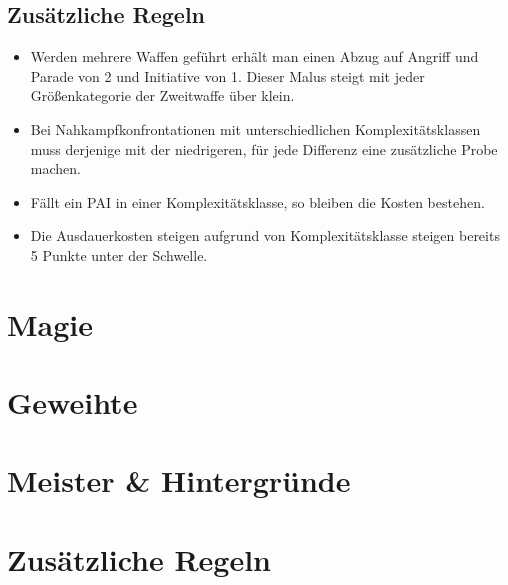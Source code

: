 \documentclass[a4paper,12pt,oneside]{book}
\begin{document}
\chapter{Zusätzliche Regeln}
\begin{itemize}
\item Werden mehrere Waffen geführt erhält man einen Abzug auf Angriff und Parade von 2 und Initiative von 1. Dieser Malus steigt mit jeder Größenkategorie der Zweitwaffe über klein.
\item Bei Nahkampfkonfrontationen mit unterschiedlichen Komplexitätsklassen muss derjenige mit der niedrigeren, für jede Differenz eine zusätzliche Probe machen.
\item Fällt ein PAI in einer Komplexitätsklasse, so bleiben die Kosten bestehen.
\item Die Ausdauerkosten steigen aufgrund von Komplexitätsklasse steigen bereits 5 Punkte unter der Schwelle.
\end{itemize} 


\part{Magie}
\setcounter{chapter}{0}
\part{Geweihte}
\setcounter{chapter}{0}
\part{Meister \& Hintergründe}
\setcounter{chapter}{0}
\part{Zusätzliche Regeln}
\setcounter{chapter}{0}
\end{document}
